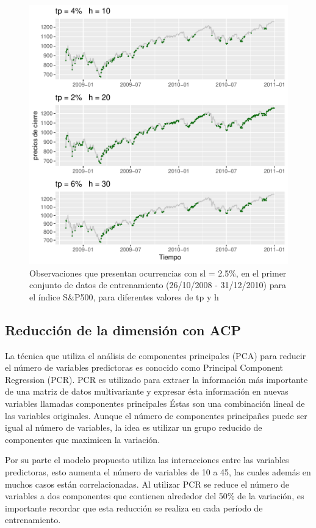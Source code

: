 \documentclass[a4paper,12pt]{Latex/Classes/PhDthesisPSnPDF}
\begin{document}
\begin{figure}[H]
\centering
\includegraphics{main-003}
\caption{Observaciones que presentan ocurrencias con sl = 2.5\%, en el primer conjunto de datos de entrenamiento (26/10/2008 - 31/12/2010) para el índice S\&P500, para diferentes valores de tp y h}
\end{figure}


\subsection{Reducción de la dimensión con ACP}

La técnica que utiliza el análisis de componentes principales (PCA) para reducir el número de variables predictoras es conocido como Principal Component Regression (PCR). PCR es utilizado para extraer la información más importante de una matriz de datos multivariante y expresar ésta información en nuevas variables llamadas componentes principales Éstas son una combinación lineal de las variables originales. Aunque el número de componentes principañes puede ser igual al número de variables, la idea es utilizar un grupo reducido de componentes que maximicen la variación.

Por su parte el modelo propuesto utiliza las interacciones entre las variables predictoras, esto aumenta el número de variables de 10 a 45, las cuales además en muchos casos están correlacionadas. Al utilizar PCR se reduce el número de variables a dos componentes que contienen alrededor del 50\% de la variación, es importante recordar que esta reducción se realiza en cada período de entrenamiento.
\end{document}
